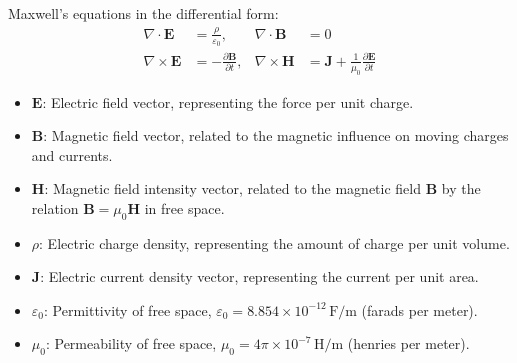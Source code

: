 \documentclass{beamer}
\begin{document}
\begin{frame} {Maxwell's equations in the differential form:}
\begin{align*}
    \nabla \cdot \mathbf{E} &= \frac{\rho}{\varepsilon_0}, &\nabla \cdot \mathbf{B} &= 0 \\
    \nabla \times \mathbf{E} &= -\frac{\partial \mathbf{B}}{\partial t}, &\nabla \times \mathbf{H} &= \mathbf{J} + \frac{1}{\mu_0}\frac{\partial \mathbf{E}}{\partial t}
\end{align*}


\begin{itemize}
    \item \(\mathbf{E}\): Electric field vector, representing the force per unit charge.
    \item \(\mathbf{B}\): Magnetic field vector, related to the magnetic influence on moving charges and currents.
    \item \(\mathbf{H}\): Magnetic field intensity vector, related to the magnetic field \(\mathbf{B}\) by the relation \(\mathbf{B} = \mu_0 \mathbf{H}\) in free space.
    \item \(\rho\): Electric charge density, representing the amount of charge per unit volume.
    \item \(\mathbf{J}\): Electric current density vector, representing the current per unit area.
    \item \(\varepsilon_0\): Permittivity of free space, \(\varepsilon_0 = 8.854 \times 10^{-12} \, \mathrm{F/m}\) (farads per meter).
    \item \(\mu_0\): Permeability of free space, \(\mu_0 = 4\pi \times 10^{-7} \, \mathrm{H/m}\) (henries per meter).
\end{itemize}
  
\end{frame}
\end{document}
